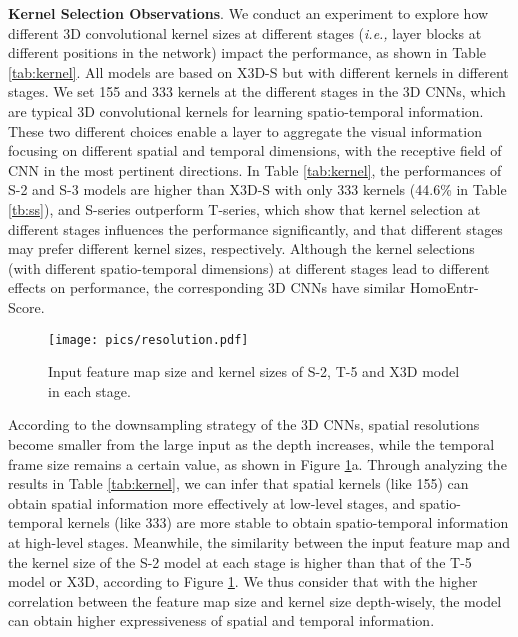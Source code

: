 \documentclass{article} \usepackage{iclr2023_conference,times}
\def\ie{\emph{i.e., }}
\begin{document}
\noindent\textbf{Kernel Selection Observations}.
We conduct an experiment to explore how different 3D convolutional kernel sizes at different stages (\ie layer blocks at different positions in the network) impact the performance, as shown in Table \ref{tab:kernel}.
All models are based on X3D-S but with different kernels in different stages. We set 155 and 333 kernels at the different stages in the 3D CNNs, which are typical 3D convolutional kernels for learning spatio-temporal information. 
These two different  choices enable a layer to aggregate the visual information focusing on different spatial and temporal dimensions, 
with the receptive field of CNN in the most pertinent directions.
In Table \ref{tab:kernel}, the performances of S-2 and S-3 models are higher than X3D-S with only 333 kernels (44.6\% in Table \ref{tb:ss}), and S-series outperform T-series, which show that kernel selection at different stages influences the performance significantly, and that different stages may prefer different kernel sizes, respectively. 
Although the kernel selections (with different spatio-temporal dimensions) at different stages lead to different effects on performance, the corresponding 3D CNNs have similar HomoEntr-Score. 



\begin{figure}[h]
    \centering
    \texttt{[image: pics/resolution.pdf]}
\caption{Input feature map size and kernel sizes of S-2, T-5 and X3D model in each stage.}
    \label{fig:resolution}
\end{figure}



According to the downsampling strategy of the 3D CNNs, spatial resolutions become smaller from the large input as the depth increases, while the temporal frame size remains a certain value, as shown in Figure \ref{fig:resolution}a.
Through analyzing the results in Table \ref{tab:kernel}, we can infer that spatial kernels (like 155) can obtain spatial information more effectively at low-level stages, and spatio-temporal kernels (like 333) are more stable to obtain spatio-temporal information at high-level stages. 
Meanwhile, the similarity between the input feature map and the kernel size of the S-2 model at each stage is higher than that of the T-5 model or X3D, according to Figure \ref{fig:resolution}.
We thus consider that with the higher correlation between the feature map size and kernel size depth-wisely, the model can obtain higher expressiveness of spatial and temporal information.
\end{document}
